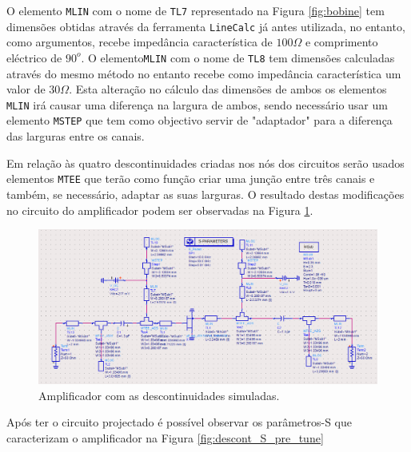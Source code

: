 \documentclass[11pt]{article}
\numberwithin{equation}{section}
\begin{document}
O elemento \texttt{MLIN} com o nome de \texttt{TL7} representado na Figura \ref{fig:bobine} tem dimensões obtidas através da ferramenta \texttt{LineCalc} já antes utilizada, no entanto, como argumentos, recebe impedância característica de $ 100 \Omega $ e comprimento eléctrico de $ 90^{o} $. O elemento\texttt{MLIN} com o nome de \texttt{TL8} tem dimensões calculadas através do mesmo método no entanto recebe como impedância característica um valor de $ 30 \Omega $. Esta alteração no cálculo das dimensões de ambos os elementos \texttt{MLIN} irá causar uma diferença na largura de ambos, sendo necessário usar um elemento \texttt{MSTEP} que tem como objectivo servir de "adaptador" para a diferença das larguras entre os canais.

Em relação às quatro descontinuidades criadas nos nós dos circuitos serão usados elementos \texttt{MTEE} que terão como função criar uma junção entre três canais e também, se necessário, adaptar as suas larguras. O resultado destas modificações no circuito do amplificador podem ser observadas na Figura \ref{fig:Circuito_pre_tune}.

\begin{figure}[H]
	\centering
	\includegraphics[keepaspectratio=true, scale=0.45]{exps/Circuito_descont_pre_tune}
	\vspace{-0.5em}
	\caption{Amplificador com as descontinuidades simuladas.}
	\vspace{-0.8em}
	\label{fig:Circuito_pre_tune}
\end{figure}

Após ter o circuito projectado é possível observar os parâmetros-S que caracterizam o amplificador na Figura \ref{fig:descont_S_pre_tune}
\end{document}
